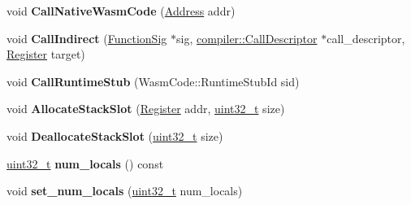 \begin{DoxyCompactItemize}
\item 
\mbox{\label{classv8_1_1internal_1_1wasm_1_1LiftoffAssembler_a8da0de00d1d6a791a9f3a2252735d57f}} 
void {\bfseries Call\+Native\+Wasm\+Code} (\mbox{\hyperlink{classuintptr__t}{Address}} addr)
\item 
\mbox{\label{classv8_1_1internal_1_1wasm_1_1LiftoffAssembler_af326944883936b7bad8db6fee42190ea}} 
void {\bfseries Call\+Indirect} (\mbox{\hyperlink{classv8_1_1internal_1_1Signature}{Function\+Sig}} $\ast$sig, \mbox{\hyperlink{classv8_1_1internal_1_1compiler_1_1CallDescriptor}{compiler\+::\+Call\+Descriptor}} $\ast$call\+\_\+descriptor, \mbox{\hyperlink{classv8_1_1internal_1_1Register}{Register}} target)
\item 
\mbox{\label{classv8_1_1internal_1_1wasm_1_1LiftoffAssembler_a1e635fc01f4ae5de38fc53165d31d16a}} 
void {\bfseries Call\+Runtime\+Stub} (Wasm\+Code\+::\+Runtime\+Stub\+Id sid)
\item 
\mbox{\label{classv8_1_1internal_1_1wasm_1_1LiftoffAssembler_acf2d43dbbbeba5e8eb26796f085cd91c}} 
void {\bfseries Allocate\+Stack\+Slot} (\mbox{\hyperlink{classv8_1_1internal_1_1Register}{Register}} addr, \mbox{\hyperlink{classuint32__t}{uint32\+\_\+t}} size)
\item 
\mbox{\label{classv8_1_1internal_1_1wasm_1_1LiftoffAssembler_a4b7334ec7c82cc09516a572bd5a105c7}} 
void {\bfseries Deallocate\+Stack\+Slot} (\mbox{\hyperlink{classuint32__t}{uint32\+\_\+t}} size)
\item 
\mbox{\label{classv8_1_1internal_1_1wasm_1_1LiftoffAssembler_a91f620639956e4d777bcd9de2647f511}} 
\mbox{\hyperlink{classuint32__t}{uint32\+\_\+t}} {\bfseries num\+\_\+locals} () const
\item 
\mbox{\label{classv8_1_1internal_1_1wasm_1_1LiftoffAssembler_ac08c7344ac7cb0fdefd7556c05f5f1f7}} 
void {\bfseries set\+\_\+num\+\_\+locals} (\mbox{\hyperlink{classuint32__t}{uint32\+\_\+t}} num\+\_\+locals)

\end{DoxyCompactItemize}
